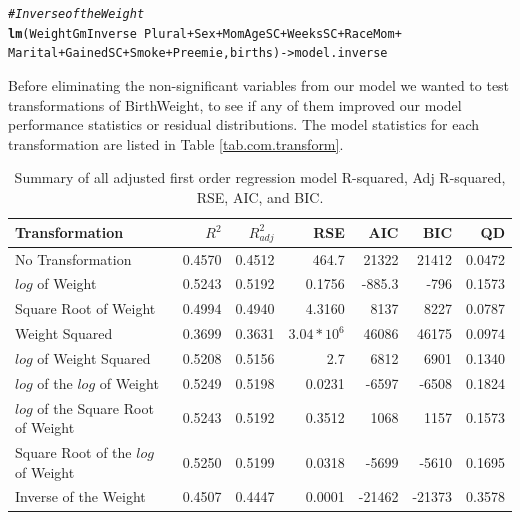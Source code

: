 \documentclass{article}\usepackage[]{graphicx}\usepackage[]{xcolor}
\makeatletter
\newcommand{\hlcom}[1]{\textcolor[rgb]{0.678,0.584,0.686}{\textit{#1}}}%
\newcommand{\hlopt}[1]{\textcolor[rgb]{0,0,0}{#1}}%
\newcommand{\hlstd}[1]{\textcolor[rgb]{0.345,0.345,0.345}{#1}}%
\newcommand{\hlkwb}[1]{\textcolor[rgb]{0.69,0.353,0.396}{#1}}%
\newcommand{\hlkwd}[1]{\textcolor[rgb]{0.737,0.353,0.396}{\textbf{#1}}}%
\newenvironment{kframe}{%
 \def\at@end@of@kframe{}%
 \ifinner\ifhmode%
  \def\at@end@of@kframe{\end{minipage}}%
  \begin{minipage}{\columnwidth}%
 \fi\fi%
 \def\FrameCommand##1{\hskip\@totalleftmargin \hskip-\fboxsep
 \colorbox{shadecolor}{##1}\hskip-\fboxsep
     \hskip-\linewidth \hskip-\@totalleftmargin \hskip\columnwidth}%
 \MakeFramed {\advance\hsize-\width
   \@totalleftmargin\z@ \linewidth\hsize
   \@setminipage}}%
 {\par\unskip\endMakeFramed%
 \at@end@of@kframe}
\newenvironment{knitrout}{}{} %
\makeatother
\begin{document}
\begin{knitrout}
\begin{kframe}
\begin{alltt}
\hlcom{# Inverse of the Weight}
\hlkwd{lm}\hlstd{(WeightGmInverse} \hlopt{~} \hlstd{Plural} \hlopt{+} \hlstd{Sex} \hlopt{+} \hlstd{MomAgeSC} \hlopt{+} \hlstd{WeeksSC} \hlopt{+} \hlstd{RaceMom} \hlopt{+}
     \hlstd{Marital} \hlopt{+} \hlstd{GainedSC} \hlopt{+} \hlstd{Smoke} \hlopt{+} \hlstd{Preemie, births)} \hlkwb{->} \hlstd{model.inverse}
\end{alltt}
\end{kframe}
\end{knitrout}

Before eliminating the non-significant variables from our model we wanted to test transformations of BirthWeight, to see if any of them improved our model performance statistics or residual distributions. The model statistics for each transformation are listed in Table \ref{tab.com.transform}. 

\begin{table}[ht]
\centering
\begin{tabular}{lrrrrrr}
  \hline
  Transformation & $R^2$ & $R^2_{adj}$ & RSE & AIC & BIC & QD\\ 
  \hline
   No Transformation & 0.4570 & 0.4512 & 464.7 & 21322 & 21412 & 0.0472 \\ 
   $log$ of Weight & 0.5243 & 0.5192 & 0.1756 & -885.3 & -796 & 0.1573\\ 
   Square Root of Weight & 0.4994 & 0.4940 & 4.3160 & 8137 & 8227 & 0.0787 \\
   Weight Squared & 0.3699 & 0.3631 & $3.04 * 10^6$ & 46086 & 46175 & 0.0974 \\
   $log$ of Weight Squared & 0.5208 & 0.5156 & 2.7 & 6812 & 6901 & 0.1340\\
   $log$ of the $log$ of Weight & 0.5249 & 0.5198 & 0.0231 & -6597 & -6508 & 0.1824 \\
   $log$ of the Square Root of Weight & 0.5243 & 0.5192 & 0.3512 & 1068 & 1157 & 0.1573\\
   Square Root of the $log$ of Weight & 0.5250 & 0.5199 & 0.0318 & -5699 & -5610 & 0.1695\\
   Inverse of the Weight & 0.4507 & 0.4447 & 0.0001 & -21462 & -21373 & 0.3578 \\
   \hline
\end{tabular}
\caption{Summary of all adjusted first order regression model R-squared, Adj R-squared, RSE, AIC, and BIC.}
\label{tab.comp.transform}
\end{table}
\end{document}
